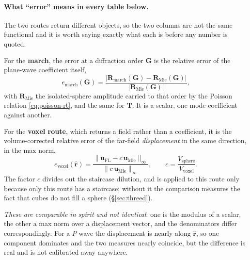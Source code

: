 \documentclass[11pt,a4paper]{article}
\newcommand{\bT}{\mathbf{T}}
\newcommand{\bu}{\mathbf{u}}
\newcommand{\bR}{\mathbf{R}}
\begin{document}
\paragraph{What ``error'' means in every table below.}  The two routes return
different objects, so the two columns are not the same functional and it is
worth saying exactly what each is before any number is quoted.

For the \textbf{march}, the error at a diffraction order $\mathbf{G}$ is the
relative error of the plane-wave coefficient itself,
\begin{equation}\label{eq:errmarch}
  e_{\text{march}}(\mathbf{G})
  = \frac{\bigl|\bR_{\text{march}}(\mathbf{G})-\bR_{\text{Mie}}(\mathbf{G})\bigr|}
         {\bigl|\bR_{\text{Mie}}(\mathbf{G})\bigr|},
\end{equation}
with $\bR_{\text{Mie}}$ the isolated-sphere amplitude carried to that order by
the Poisson relation \eqref{eq:poisson-rt}, and the same for $\bT$.  It is a
scalar, one mode coefficient against another.

For the \textbf{voxel route}, which returns a field rather than a coefficient,
it is the volume-corrected relative error of the far-field \emph{displacement}
in the same direction, in the max norm,
\begin{equation}\label{eq:errvoxel}
  e_{\text{voxel}}(\hat{\mathbf{r}})
  = \frac{\bigl\|\bu_{\text{FL}}
            - c\,\bu_{\text{Mie}}\bigr\|_{\infty}}
         {\bigl\|c\,\bu_{\text{Mie}}\bigr\|_{\infty}},
  \qquad c = \frac{V_{\text{sphere}}}{V_{\text{voxel}}} .
\end{equation}
The factor $c$ divides out the staircase dilution, and is applied to this route
only because only this route has a staircase; without it the comparison measures
the fact that cubes do not fill a sphere (\S\ref{sec:threed}).

\emph{These are comparable in spirit and not identical}: one is the modulus of
a scalar, the other a max norm over a displacement vector, and the denominators
differ correspondingly.  For a $P$ wave the displacement is nearly along
$\hat{\mathbf{r}}$, so one component dominates and the two measures nearly
coincide, but the difference is real and is not calibrated away anywhere.
\end{document}
